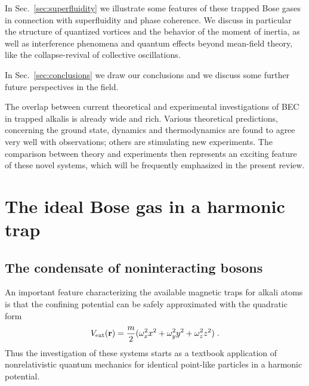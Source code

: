 In Sec.~\ref{sec:superfluidity}
we illustrate some features of these trapped Bose gases in connection
with superfluidity and phase coherence. We discuss in particular
the structure of quantized vortices and the behavior of the moment of
inertia, as well as interference phenomena and quantum effects beyond
mean-field theory, like the collapse-revival of collective 
oscillations.

In Sec.~\ref{sec:conclusions}
we draw our conclusions and we discuss some further future perspectives
in the field.

The overlap between current theoretical and experimental 
investigations of BEC in trapped alkalis is already wide and rich. 
Various theoretical predictions, concerning the ground state, dynamics 
and thermodynamics are found to agree very well with observations;  
others are stimulating new experiments. The comparison between theory and
experiments then represents an exciting feature of these novel 
systems, which will be frequently emphasized in the present review.


\section{The ideal Bose gas in a harmonic trap}
\label{sec:theidealgas}

\subsection{The condensate of noninteracting bosons}
\label{sec:noninteracting}

An important feature characterizing the available magnetic
traps for alkali atoms is that the confining potential can be safely 
approximated with the quadratic form 
\begin{equation}
V_{\rm ext}({\bf r}) = {m\over 2} ( \omega_x^2 x^2 + \omega_y^2 y^2
+ \omega_z^2 z^2) \; .
\label{eq:uext}
\end{equation}
Thus the investigation of these systems starts as a
textbook application of nonrelativistic quantum mechanics for
identical point-like particles in a harmonic potential.

